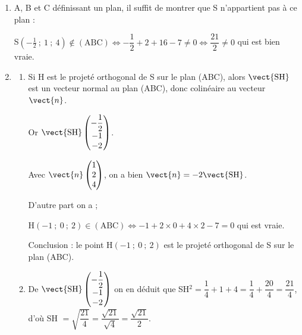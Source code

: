 \begin{enumerate}
\begin{enumerate}
Ces deux vecteurs ne sont pas colinéaires : leurs premières coordonnées sont égales mais pas les autres

Or $\vect{n} \cdot \vect{\text{AB}} = 2 - 6 + 4 = 0$ et $\vect{n} \cdot \vect{\text{AC}} = 2 - 2 + 0 = 0$.

Conclusion $\vect{n}$ orthogonal à deux vecteurs non colinéaires du plan (ABC) est un vecteur normal à ce plan.
	\item Le résultat précédent montre que :
	
$M(x~;~y~;~z) in (\text{ABC}) \iff 1x + 2y + 4z + d = 0, \: d \in \R$.

En particulier C$(1~;~1~;~1) in (\text{ABC}) \iff 1 + 2 + 4 + d = 0, \: d \in \R \iff  d = - 7$.

Finalement : $M(x~;~y~;~z) in (\text{ABC}) \iff x + 2y + 4z - 7 = 0$.
	\end{enumerate}
\item A, B et C définissant un plan, il suffit de montrer que S n'appartient pas à ce plan :

S$\left(- \frac 12~;~1~;~4\right) \notin (\text{ABC}) \iff - \dfrac 12  + 2 + 16 - 7 \ne 0 \iff \dfrac{21}{2} \ne 0$ qui est bien vraie.
\item 
	\begin{enumerate}
		\item Si H est le projeté orthogonal de S sur le plan (ABC), alors $\vect{\text{SH}}$ est un vecteur normal au plan (ABC), donc colinéaire au vecteur $\vect{n}$.
		
Or $\vect{\text{SH}}\begin{pmatrix}- \dfrac 12\\- 1\\-2\end{pmatrix}$.

Avec $\vect{n}\begin{pmatrix} 1\\2\\4\end{pmatrix}$, on a bien $\vect{n} = - 2\vect{\text{SH}}$.

D'autre part on a ;

H$(-1~;~0~;~2) \in (\text{ABC}) \iff - 1 + 2\times 0  + 4 \times 2 - 7 = 0$ qui est vraie.

Conclusion : le point H$(-1~;~0~;~2)$ est le projeté orthogonal de S sur le plan (ABC).
	\item De $\vect{\text{SH}}\begin{pmatrix}- \dfrac 12\\- 1\\-2\end{pmatrix}$ on en déduit que SH$^2 = \dfrac 14 + 1 + 4 = \dfrac 14 + \dfrac{20}{4} = \dfrac{21}{4}$, d'où SH $ = \sqrt{\dfrac{21}{4}} = \dfrac{\sqrt{21}}{\sqrt{4}} = \dfrac{\sqrt{21}}{2}$.
	

\end{enumerate}
\end{enumerate}
